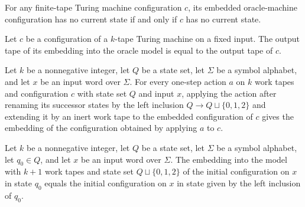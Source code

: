\begin{lemma}
\label{Turing.Cfg.embedOracle_state_eq_none}
\leanok
{}
For any finite-tape Turing machine configuration $c$, its embedded oracle-machine
configuration has no current state if and only if $c$ has no current state.
\end{lemma}

\begin{lemma}
\label{Turing.Cfg.embedOracle_output}
\leanok
{}
Let $c$ be a configuration of a $k$-tape Turing machine on a fixed input. The output
tape of its embedding into the oracle model is equal to the output tape of $c$.
\end{lemma}

\begin{lemma}
\label{Turing.Cfg.embedOracle_apply}
\leanok
{}
Let $k$ be a nonnegative integer, let $Q$ be a state set, let $\Sigma$ be a symbol
alphabet, and let $x$ be an input word over $\Sigma$. For every one-step action $a$ on
$k$ work tapes and configuration $c$ with state set $Q$ and input $x$, applying the
action after renaming its successor states by the left inclusion $Q\to Q\sqcup\{0,1,2\}$
and extending it by an inert work tape to the embedded configuration of $c$ gives the
embedding of the configuration obtained by applying $a$ to $c$.
\end{lemma}

\begin{lemma}
\label{Turing.Cfg.embedOracle_init}
\leanok
{}
Let $k$ be a nonnegative integer, let $Q$ be a state set, let $\Sigma$ be a symbol
alphabet, let $q_0\in Q$, and let $x$ be an input word over $\Sigma$. The embedding into
the model with $k+1$ work tapes and state set $Q\sqcup\{0,1,2\}$ of the initial
configuration on $x$ in state $q_0$ equals the initial configuration on $x$ in state
given by the left inclusion of $q_0$.
\end{lemma}

